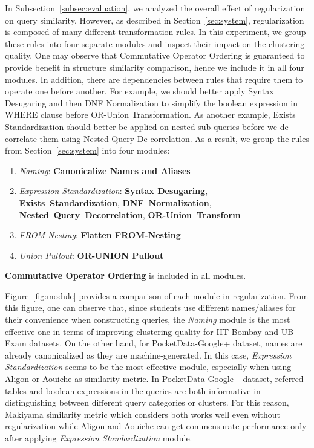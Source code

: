 In Subsection~\ref{subsec:evaluation}, we analyzed the overall effect of regularization on query similarity.  However, as described in Section~\ref{sec:system}, regularization is composed of many different transformation rules.  
In this experiment, we group these rules into four separate modules and inspect their impact on the clustering quality. 
One may observe that Commutative Operator Ordering is guaranteed to provide benefit in structure similarity comparison, hence we include it in all four modules. 
In addition, there are dependencies between rules that require them to operate one before another. 
For example, we should better apply Syntax Desugaring and then DNF Normalization to simplify the boolean expression in WHERE clause before OR-Union Transformation.
As another example, Exists Standardization should better be applied on nested sub-queries before we de-correlate them using Nested Query De-correlation.
As a result, we group the rules from Section~\ref{sec:system} into four modules:
\begin{enumerate}
\item \textit{Naming}: \textbf{Canonicalize Names and Aliases}
\item \textit{Expression Standardization}: \textbf{Syntax Desugaring}, \\\textbf{Exists~Standardization}, \textbf{DNF~Normalization}, \\\textbf{Nested~Query~Decorrelation}, \textbf{OR-Union~Transform}
\item \textit{FROM-Nesting}: \textbf{Flatten FROM-Nesting}
\item \textit{Union Pullout}: \textbf{OR-UNION Pullout}
\end{enumerate}
\textbf{Commutative Operator Ordering} is included in all modules.

Figure~\ref{fig:module} provides a comparison of each module in regularization. From this figure, one can observe that, since students use different names/aliases for their convenience when constructing queries, the \textit{Naming} module is the most effective one in terms of improving clustering quality for IIT Bombay and UB Exam datasets. On the other hand, for PocketData-Google+ dataset, names are already canonicalized as they are machine-generated. In this case, \textit{Expression Standardization} seems to be the most effective module, especially when using Aligon or Aouiche as similarity metric. In PocketData-Google+ dataset, referred tables and boolean expressions in the queries are both informative in distinguishing between different query categories or clusters. For this reason, Makiyama similarity metric which considers both works well even without regularization while Aligon and Aouiche can get commensurate performance only after applying \textit{Expression Standardization} module. 

